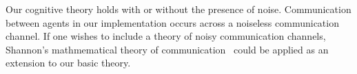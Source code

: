 Our cognitive theory holds with or without the presence of noise.
Communication between agents in our implementation occurs across a
noiseless communication channel.  If one wishes to include a theory of
noisy communication channels, Shannon's mathmematical theory of
communication~\citep{shannon:1959} could be applied as an extension to
our basic theory.



